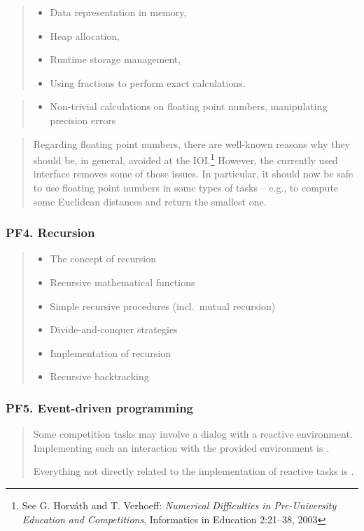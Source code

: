 \documentclass[a4paper,11pt,oneside]{article}
\newcommand{\cmark}{\ding{51}}%
\newcommand{\xmark}{\ding{55}}%
\newcommand{\CC}[1]{#1}
\newcommand{\Cincluded}{{\small\cmark}}
\newcommand{\Cdefine}{{\small\cmark\faFileTextO}}
\newcommand{\Ccodeonly}{{\small\cmark\faFileText}}
\newcommand{\Cnofocus}{{\small\faQuestion}}
\newcommand{\Cexcluded}{{\small\xmark}}
\newcommand{\Iincluded}{\item[\hbox to 1.8em{\Cincluded\hfill}]}
\newcommand{\Icodeonly}{\item[\hbox to 1.8em{\Ccodeonly\hfill}]}
\newcommand{\Inofocus}{\item[\hbox to 1.8em{\Cnofocus\hfill}]}
\newcommand{\Iexcluded}{\item[\hbox to 1.8em{\Cexcluded\hfill}]}
\newenvironment{myitemize}{\begin{quote}\begin{itemize}\itemsep 0pt}{\end{itemize}\end{quote}}
\begin{document}
    \begin{myitemize}
    \Inofocus \CC{Data representation in memory},
    \Inofocus \CC{Heap allocation},
    \Inofocus  \CC{Runtime storage management},
    \Inofocus Using fractions to perform exact calculations.
    \end{myitemize}
    
    \begin{myitemize}
    \Iexcluded Non-trivial calculations on floating point numbers, manipulating precision errors
    \end{myitemize}
   
    \begin{quote}
    Regarding floating point numbers, there are well-known reasons why they
    should be, in general, avoided at the IOI.\footnote{%
    See G. Horv\'ath and T. Verhoeff: \emph{Numerical Difficulties in Pre-University Education and
    Competitions}, Informatics in Education 2:21--38, 2003}
    However, the currently used interface removes some of those issues.
    In particular, it should now be safe to use floating point numbers
    in some types of tasks -- e.g., to compute some Euclidean distances and 
    return the smallest one.
    \end{quote}

    \subsubsection*{PF4. Recursion}

    \begin{myitemize}
    \Iincluded\CC{The concept of recursion}
    \Iincluded\CC{Recursive mathematical functions}
    \Iincluded\CC{Simple recursive procedures} (incl.\ mutual recursion)
    \Icodeonly\CC{Divide-and-conquer strategies}
    \Icodeonly\CC{Implementation of recursion}
    \Icodeonly\CC{Recursive backtracking}
    \end{myitemize}

    \subsubsection*{PF5. Event-driven programming}

    \begin{quote}
    Some competition tasks may involve a dialog with a reactive environment.
    Implementing such an interaction with the provided environment is \Cdefine.

    Everything not directly related to the implementation of reactive tasks is \Cnofocus.
    \end{quote}
\end{document}
